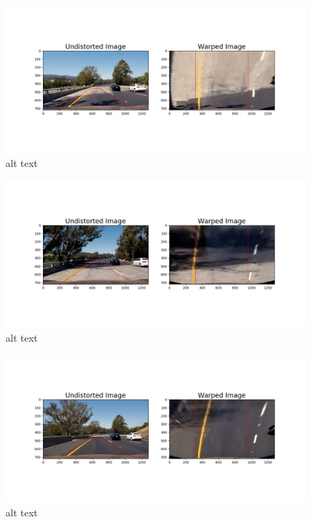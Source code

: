 \documentclass[11pt]{article}
\makeatletter
\def\maxwidth{\ifdim\Gin@nat@width>\linewidth\linewidth
    \else\Gin@nat@width\fi}
\let\Oldincludegraphics\includegraphics
\renewcommand{\includegraphics}[1]{\Oldincludegraphics[width=.8\maxwidth]{#1}}
\makeatother
\begin{document}
\begin{figure}
\centering
\includegraphics{./output_images/3_transformed/test4.png}
\caption{alt text}
\end{figure}

\begin{figure}
\centering
\includegraphics{./output_images/3_transformed/test5.png}
\caption{alt text}
\end{figure}

\begin{figure}
\centering
\includegraphics{./output_images/3_transformed/test6.png}
\caption{alt text}
\end{figure}
\end{document}
